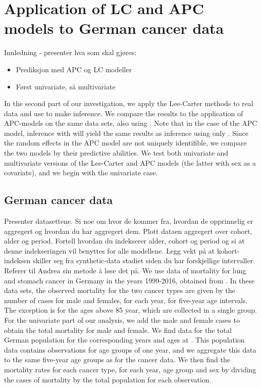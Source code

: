 \newpage
\section{Application of LC and APC models to German cancer data}
\textcolor{myDarkGreen}{Innledning - presenter hva som skal gjøres:
\begin{itemize}
    \item Prediksjon med APC og LC modeller
    \item Først univariate, så multivariate
\end{itemize}
}
In the second part of our investigation, we apply the Lee-Carter methods to real data and use \inlabru to make inference. We compare the results to the application of APC-models on the same data sets, also using \inlabru. Note that in the case of the APC model, inference with \inlabru will yield the same results as inference using only \inla. Since the random effects in the APC model are not uniquely identifible, we compare the two models by their predictive abilities. We test both univariate and multivariate versions of the Lee-Carter and APC models (the latter with sex as a covariate), and we begin with the univariate case. 
\subsection{German cancer data}
\label{sec:GermanCancerData}
\textcolor{myDarkGreen}{
Presenter datasettene. Si noe om hvor de kommer fra, hvordan de opprinnelig er aggregert og hvordan du har aggregert dem. Plott dataen aggregert over cohort, alder og period. Fortell hvordan du indekserer alder, cohort og period og si at denne indekseringen vil benyttes for alle modellene. Legg vekt på at kohort-indeksen skiller seg fra synthetic-data stadiet siden du har forskjellige intervaller. Referer til Andrea sin metode å løse det på. 
}
We use data of mortality for lung and stomach cancer in Germany in the years 1999-2016, obtained from . In these data sets, the observed mortality for the two cancer types are given by the number of cases for male and females, for each year, for five-year age intervals. The exception is for the ages above 85 year, which are collected in a single group. For the univariate part of our analysis, we add the male and female cases to obtain the total mortality for male and female. We find data for the total German population for the corresponding years and ages at . This population data contains observations for age groups of one year, and we aggregate this data to the same five-year age groups as for the cancer data. We then find the mortality rates for each cancer type, for each year, age group and sex by dividing the cases of mortality by the total population for each observation. 

